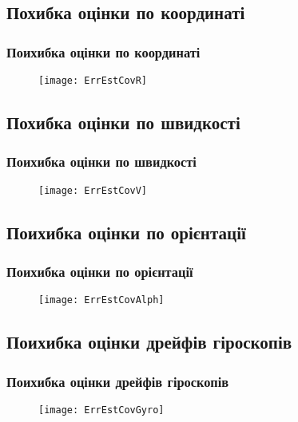 \documentclass[ucs,compress]{beamer}    %
\begin{document}
\subsection{Похибка оцінки по координаті} 
\begin{frame}%
\frametitle{Поихибка оцінки по координаті}
\noindent
\begin{figure}
\texttt{[image: ErrEstCovR]}
\end{figure}
\end{frame}

\subsection{Похибка оцінки по швидкості} 
\begin{frame}%
\frametitle{Поихибка оцінки по швидкості}
\noindent
\begin{figure}
\texttt{[image: ErrEstCovV]}
\end{figure}
\end{frame}

\subsection{Поихибка оцінки по орієнтації} 
\begin{frame}%
\frametitle{Поихибка оцінки по орієнтації}
\noindent
\begin{figure}
\texttt{[image: ErrEstCovAlph]}
\end{figure}
\end{frame}

\subsection{Поихибка оцінки дрейфів гіроскопів} 
\begin{frame}%
\frametitle{Поихибка оцінки дрейфів гіроскопів}
\noindent
\begin{figure}
\texttt{[image: ErrEstCovGyro]}
\end{figure}
\end{frame}
\end{document}
